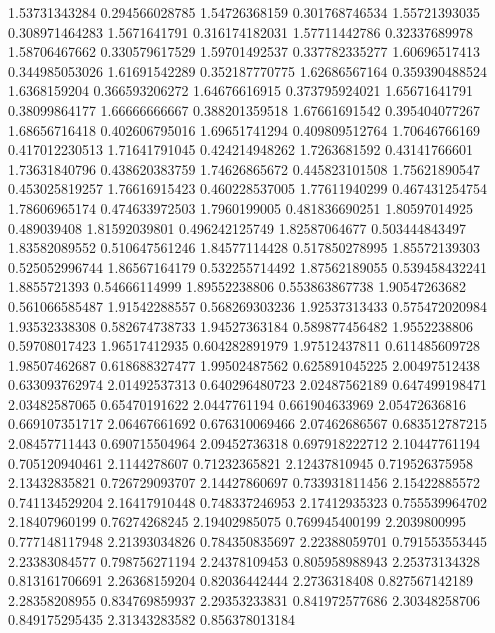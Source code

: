   1.53731343284   0.294566028785
  1.54726368159   0.301768746534
  1.55721393035   0.308971464283
   1.5671641791   0.316174182031
  1.57711442786    0.32337689978
  1.58706467662   0.330579617529
  1.59701492537   0.337782335277
  1.60696517413   0.344985053026
  1.61691542289   0.352187770775
  1.62686567164   0.359390488524
   1.6368159204   0.366593206272
  1.64676616915   0.373795924021
  1.65671641791    0.38099864177
  1.66666666667   0.388201359518
  1.67661691542   0.395404077267
  1.68656716418   0.402606795016
  1.69651741294   0.409809512764
  1.70646766169   0.417012230513
  1.71641791045   0.424214948262
   1.7263681592    0.43141766601
  1.73631840796   0.438620383759
  1.74626865672   0.445823101508
  1.75621890547   0.453025819257
  1.76616915423   0.460228537005
  1.77611940299   0.467431254754
  1.78606965174   0.474633972503
   1.7960199005   0.481836690251
  1.80597014925      0.489039408
  1.81592039801   0.496242125749
  1.82587064677   0.503444843497
  1.83582089552   0.510647561246
  1.84577114428   0.517850278995
  1.85572139303   0.525052996744
  1.86567164179   0.532255714492
  1.87562189055   0.539458432241
   1.8855721393    0.54666114999
  1.89552238806   0.553863867738
  1.90547263682   0.561066585487
  1.91542288557   0.568269303236
  1.92537313433   0.575472020984
  1.93532338308   0.582674738733
  1.94527363184   0.589877456482
   1.9552238806    0.59708017423
  1.96517412935   0.604282891979
  1.97512437811   0.611485609728
  1.98507462687   0.618688327477
  1.99502487562   0.625891045225
  2.00497512438   0.633093762974
  2.01492537313   0.640296480723
  2.02487562189   0.647499198471
  2.03482587065    0.65470191622
   2.0447761194   0.661904633969
  2.05472636816   0.669107351717
  2.06467661692   0.676310069466
  2.07462686567   0.683512787215
  2.08457711443   0.690715504964
  2.09452736318   0.697918222712
  2.10447761194   0.705120940461
   2.1144278607    0.71232365821
  2.12437810945   0.719526375958
  2.13432835821   0.726729093707
  2.14427860697   0.733931811456
  2.15422885572   0.741134529204
  2.16417910448   0.748337246953
  2.17412935323   0.755539964702
  2.18407960199    0.76274268245
  2.19402985075   0.769945400199
   2.2039800995   0.777148117948
  2.21393034826   0.784350835697
  2.22388059701   0.791553553445
  2.23383084577   0.798756271194
  2.24378109453   0.805958988943
  2.25373134328   0.813161706691
  2.26368159204    0.82036442444
   2.2736318408   0.827567142189
  2.28358208955   0.834769859937
  2.29353233831   0.841972577686
  2.30348258706   0.849175295435
  2.31343283582   0.856378013184
